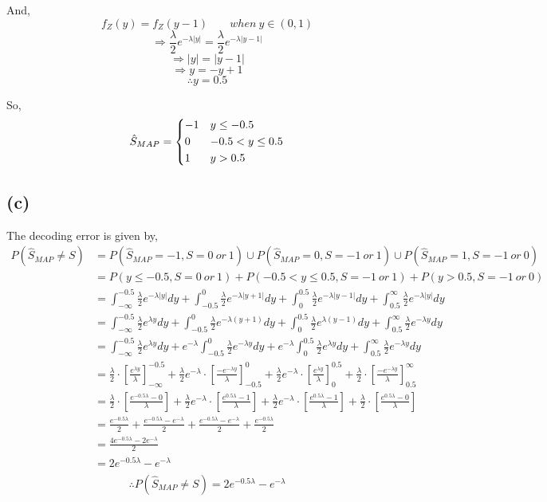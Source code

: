 \documentclass{article}
\begin{document}
	And, $$ f_Z (y) = f_Z (y-1) \; \; \; \; \; \; \; when\ y \in (0,1) $$
	$$ \Rightarrow \frac{\lambda}{2} e^{-\lambda |y|} = \frac{\lambda}{2} e^{-\lambda |y-1|} $$
	$$ \Rightarrow |y| = |y-1| $$
	$$ \Rightarrow y = -y+1 $$
	$$ \therefore y= 0.5 $$

	So, $$ \hat{S}_{MAP} = \begin{dcases}
			-1 & y\leq -0.5 \\
			0 & -0.5<y \leq 0.5 \\
			1 & y> 0.5 
			\end{dcases}
	$$
 
\subsection*{(c)}
	The decoding error is given by,
	$$ \begin{aligned}
	P(\hat{S}_{MAP} \neq S) &= P(\hat{S}_{MAP}=-1, S= 0 \ or\ 1) \cup P(\hat{S}_{MAP}=0, S= -1 \ or\ 1) \cup P(\hat{S}_{MAP}=1, S= -1 \ or\ 0) \\ 
			&= P(y \leq -0.5, S= 0 \ or\ 1) + P(-0.5<y \leq 0.5, S= -1 \ or\ 1) + P(y>0.5, S= -1 \ or\ 0) \\
			&= \int_{-\infty}^{-0.5} \frac{\lambda}{2} e^{-\lambda |y|} dy + \int_{-0.5}^{0} \frac{\lambda}{2} e^{-\lambda |y+1|} dy +\int_{0}^{0.5} \frac{\lambda}{2} e^{-\lambda |y-1|}dy +\int_{0.5}^{\infty} \frac{\lambda}{2} e^{-\lambda |y|} dy \\
			&= \int_{-\infty}^{-0.5} \frac{\lambda}{2} e^{\lambda y} dy + \int_{-0.5}^{0} \frac{\lambda}{2} e^{-\lambda (y+1)} dy +\int_{0}^{0.5} \frac{\lambda}{2} e^{\lambda (y-1)}dy +\int_{0.5}^{\infty} \frac{\lambda}{2} e^{-\lambda y} dy \\
			&= \int_{-\infty}^{-0.5} \frac{\lambda}{2} e^{\lambda y} dy + e^{-\lambda}\int_{-0.5}^{0} \frac{\lambda}{2} e^{-\lambda y} dy + e^{-\lambda}\int_{0}^{0.5} \frac{\lambda}{2} e^{\lambda y}dy +\int_{0.5}^{\infty} \frac{\lambda}{2} e^{-\lambda y} dy \\
			&= \frac{\lambda}{2} \cdot \left[ \frac{e^{\lambda y}}{\lambda}\right]_{-\infty}^{-0.5}+\frac{\lambda}{2} e^{-\lambda}\cdot \left[ \frac{-e^{-\lambda y}}{\lambda}\right]_{-0.5}^{0}+\frac{\lambda}{2} e^{-\lambda} \cdot \left[ \frac{e^{\lambda y}}{\lambda}\right]_{0}^{0.5}+\frac{\lambda}{2} \cdot \left[ \frac{-e^{-\lambda y}}{\lambda}\right]_{0.5}^{\infty}\\
			&=  \frac{\lambda}{2} \cdot \left[ \frac{e^{-0.5 \lambda}-0}{\lambda}\right]+ \frac{\lambda}{2} e^{-\lambda}\cdot \left[ \frac{e^{0.5 \lambda}-1}{\lambda}\right] + \frac{\lambda}{2} e^{-\lambda}\cdot \left[ \frac{e^{0.5 \lambda}-1}{\lambda}\right] +\frac{\lambda}{2} \cdot \left[ \frac{e^{0.5 \lambda}-0}{\lambda}\right] \\ 
			&= \frac{e^{-0.5 \lambda}}{2} + \frac{e^{-0.5 \lambda}-e^{-\lambda}}{2} + \frac{e^{-0.5 \lambda}-e^{-\lambda}}{2} +\frac{e^{-0.5 \lambda}}{2}\\
			&= \frac{4e^{-0.5 \lambda } - 2 e^{- \lambda}}{2} \\
			&= 2e^{-0.5 \lambda }-  e^{- \lambda} \\
	\end{aligned} 
	$$
	$$ \therefore P(\hat{S}_{MAP} \neq S)= 2e^{-0.5 \lambda }-  e^{- \lambda} $$
\end{document}
